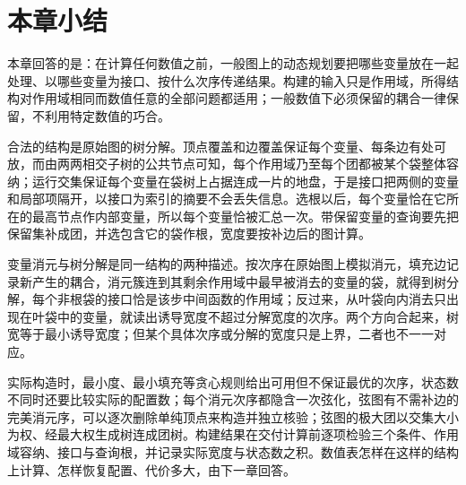\FloatBarrier
\section{本章小结}
\label{sec:dp-construction-chapter-summary}

本章回答的是：在计算任何数值之前，一般图上的动态规划要把哪些变量放在一起处理、以哪些变量为接口、按什么次序传递结果。构建的输入只是作用域，所得结构对作用域相同而数值任意的全部问题都适用；一般数值下必须保留的耦合一律保留，不利用特定数值的巧合。

合法的结构是原始图的树分解。顶点覆盖和边覆盖保证每个变量、每条边有处可放，而由两两相交子树的公共节点可知，每个作用域乃至每个团都被某个袋整体容纳；运行交集保证每个变量在袋树上占据连成一片的地盘，于是接口把两侧的变量和局部项隔开，以接口为索引的摘要不会丢失信息。选根以后，每个变量恰在它所在的最高节点作内部变量，所以每个变量恰被汇总一次。带保留变量的查询要先把保留集补成团，并选包含它的袋作根，宽度要按补边后的图计算。

变量消元与树分解是同一结构的两种描述。按次序在原始图上模拟消元，填充边记录新产生的耦合，消元簇连到其剩余作用域中最早被消去的变量的袋，就得到树分解，每个非根袋的接口恰是该步中间函数的作用域；反过来，从叶袋向内消去只出现在叶袋中的变量，就读出诱导宽度不超过分解宽度的次序。两个方向合起来，树宽等于最小诱导宽度；但某个具体次序或分解的宽度只是上界，二者也不一一对应。

实际构造时，最小度、最小填充等贪心规则给出可用但不保证最优的次序，状态数不同时还要比较实际的配置数；每个消元次序都隐含一次弦化，弦图有不需补边的完美消元序，可以逐次删除单纯顶点来构造并独立核验；弦图的极大团以交集大小为权、经最大权生成树连成团树。构建结果在交付计算前逐项检验三个条件、作用域容纳、接口与查询根，并记录实际宽度与状态数之积。数值表怎样在这样的结构上计算、怎样恢复配置、代价多大，由下一章回答。
